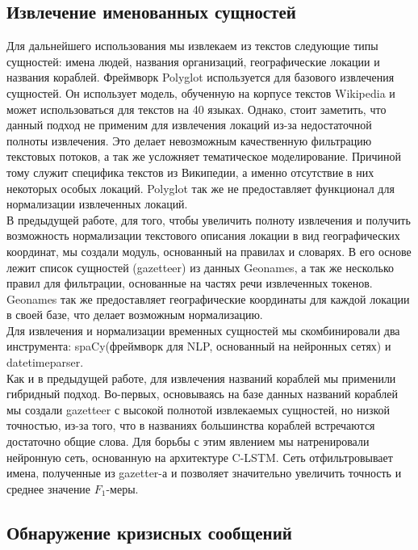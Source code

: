 \documentclass[unicode, 12pt, a4paper,oneside]{article}
\begin{document}
	\subsection{Извлечение именованных сущностей}
	Для дальнейшего использования мы извлекаем из текстов следующие типы сущностей: имена людей, названия организаций, географические локации и названия кораблей. Фреймворк Polyglot используется для базового извлечения сущностей. Он использует модель, обученную на корпусе текстов Wikipedia и может использоваться для текстов на 40 языках. Однако, стоит заметить, что данный подход не применим для извлечения локаций из-за недостаточной полноты извлечения. Это делает невозможным качественную фильтрацию текстовых потоков, а так же усложняет тематическое моделирование. Причиной тому служит специфика текстов из Википедии, а именно отсутствие в них некоторых особых локаций. Polyglot так же не предоставляет функционал для нормализации извлеченных локаций.\\
	В предыдущей работе, для того, чтобы увеличить полноту извлечения и получить возможность нормализации текстового описания локации в вид географических координат, мы создали модуль, основанный на правилах и словарях. В его основе лежит список сущностей (gazetteer) из данных Geonames, а так же несколько правил для фильтрации, основанные на частях речи извлеченных токенов. Geonames так же предоставляет географические координаты для каждой локации в своей базе, что делает возможным нормализацию.\\
	Для извлечения и нормализации временных сущностей мы скомбинировали два инструмента: spaCy(фреймворк для NLP, основанный на нейронных сетях) и datetimeparser.\\
	Как и в предыдущей работе, для извлечения названий кораблей мы применили гибридный подход. Во-первых, основываясь на базе данных названий кораблей мы создали gazetteer с высокой полнотой извлекаемых сущностей, но низкой точностью, из-за того, что в названиях большинства кораблей встречаются достаточно общие слова. Для борьбы с этим явлением мы натренировали нейронную сеть, основанную на архитектуре C-LSTM. Сеть отфильтровывает имена, полученные из gazetter-а и позволяет значительно увеличить точность и среднее значение $F_1$-меры.

	\subsection{Обнаружение кризисных сообщений}
\end{document}
